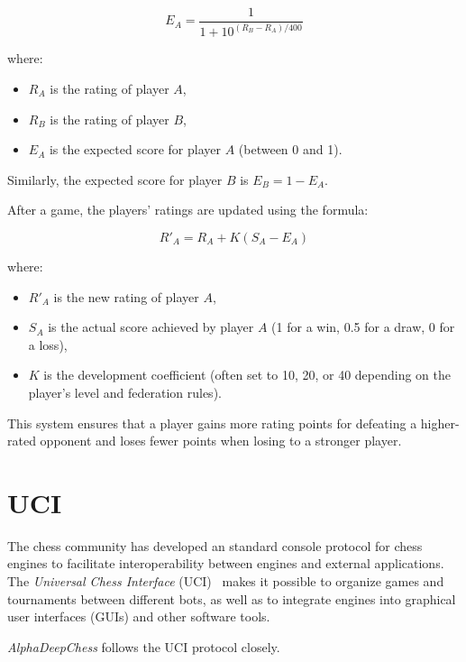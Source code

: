 \[
E_A = \frac{1}{1 + 10^{(R_B - R_A)/400}}
\]

where:
\begin{itemize}
  \item \( R_A \) is the rating of player \( A \),
  \item \( R_B \) is the rating of player \( B \),
  \item \( E_A \) is the expected score for player \( A \) (between 0 and 1).
\end{itemize}

\noindent Similarly, the expected score for player \( B \) is \( E_B = 1 - E_A \).

\vspace{1em}

\noindent After a game, the players' ratings are updated using the formula:

\[
R'_A = R_A + K (S_A - E_A)
\]

where:
\begin{itemize}
  \item \( R'_A \) is the new rating of player \( A \),
  \item \( S_A \) is the actual score achieved by player \( A \) (1 for a win, 0.5 for a draw, 0 for a loss),
  \item \( K \) is the development coefficient (often set to 10, 20, or 40 depending on the player's level and federation rules).
\end{itemize}

This system ensures that a player gains more rating points for defeating a higher-rated opponent and loses fewer points when losing to a stronger player.

\newpage

\section{UCI}
\label{sec:uci}

\noindent The chess community has developed an standard console protocol for chess engines to facilitate interoperability between engines and external applications. The \textit{Universal Chess Interface} (UCI)~\cite{UciProtocol} makes it possible to organize games and tournaments between different bots, as well as to integrate engines into graphical user interfaces (GUIs) and other software tools.

\vspace{1em}

\textit{AlphaDeepChess} follows the UCI protocol closely.

